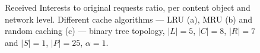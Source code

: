 \begin{figure}[h!]
    \centering



    \cprotect\caption{Received Interests to original requests ratio, per content 
        object and network level. Different cache algorithms --- LRU (a), MRU (b) and 
        random caching (c) --- binary tree topology, $|L| = 5$, $|C| = 8$, 
        $|R| = 7$ and $|S| = 1$, $|P| = 25$, $\alpha = 1$.}
    \label{fig:exp-results-latency-tree}

\end{figure}

